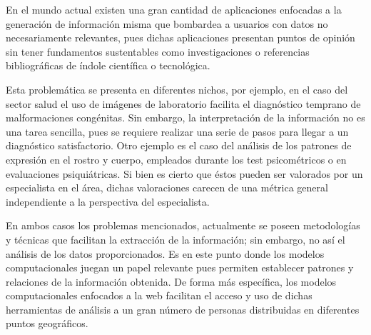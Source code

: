 En el mundo actual existen una gran cantidad de aplicaciones enfocadas a la generación de información misma que bombardea a usuarios con datos no necesariamente relevantes, pues dichas aplicaciones presentan puntos de opinión sin tener fundamentos sustentables como investigaciones o referencias bibliográficas de índole científica o tecnológica. 

Esta problemática se presenta en diferentes nichos, por ejemplo, en el caso del sector salud el uso de imágenes de laboratorio facilita el diagnóstico temprano de malformaciones congénitas. Sin embargo, la interpretación de la información no es una tarea sencilla, pues se requiere realizar una serie de pasos para llegar a un diagnóstico satisfactorio. Otro ejemplo es el caso del análisis de los patrones de expresión en el rostro y cuerpo, empleados durante los test psicométricos o en evaluaciones psiquiátricas. Si bien es cierto que éstos pueden ser valorados por un especialista en el área, dichas valoraciones carecen de una métrica general independiente a la perspectiva del especialista. 

En ambos casos los problemas mencionados, actualmente se poseen metodologías y técnicas que facilitan la extracción de la información; sin embargo, no así el análisis de los datos proporcionados. Es en este punto donde los modelos computacionales juegan un papel relevante pues permiten establecer patrones y relaciones de la información obtenida. De forma más específica, los modelos computacionales enfocados a la web facilitan el acceso y uso de dichas herramientas de análisis a un gran número de personas distribuidas en diferentes puntos geográficos. 
